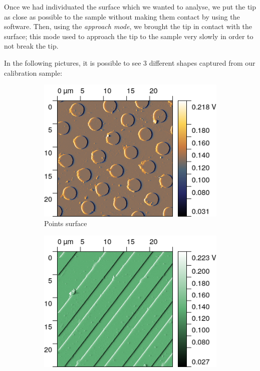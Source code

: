 \documentclass[11pt,a4paper]{article}
\begin{document}
Once we had individuated the surface which we wanted to analyse, we put the tip as close as possible to the sample without making them contact by using the software. Then, using the \emph{approach mode}, we brought the tip in contact with the surface; this mode used to approach the tip to the sample very slowly in order to not break the tip.

In the following pictures, it is possible to see 3 different shapes captured from our calibration sample:
\begin{figure}[H]
\centering
\begin{subfigure}[b]{0.45\textwidth}
\includegraphics[width=\textwidth]{sm_points}
\caption{Points surface}
\label{fig:sm_points}
\end{subfigure}
\begin{subfigure}[b]{0.45\textwidth}
\includegraphics[width=\textwidth]{sm_raws}

\end{subfigure}
\end{figure}
\end{document}
